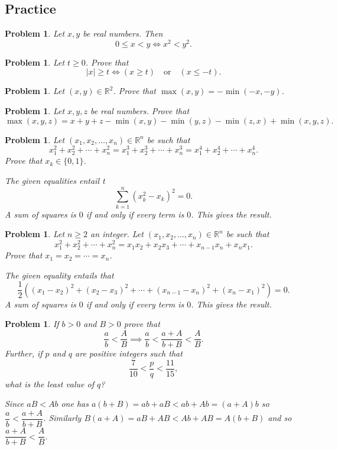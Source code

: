 \documentclass[11pt, openany]{book}
\theoremstyle{change} \theoremheaderfont{\blue\sffamily\bfseries}
\newtheorem{pro}[thm]{Problem}
\theoremstyle{nonumberplain} \theoremheaderfont{\sffamily\bfseries}
\newcommand{\BBR}{\mathbb{R}}
\newcommand{\í}{\'{\i}}
\begin{document}
\subsection*{Practice}
\begin{multicols}{2}\columnseprule 1pt \columnsep
25pt
\begin{pro}
Let $x, y$ be real numbers. Then $$ 0 \leq  x < y \iff x^2 < y^2. $$
\end{pro}
\begin{pro}Let $t \geq 0$. Prove that
$$|x| \geq t \iff (x \geq t) \quad \mathrm{or}\quad (x\leq -t).  $$
\end{pro}
\begin{pro}
Let $(x, y)\in \BBR^2$. Prove that $\max (x, y)=-\min (-x, -y)$.
\end{pro}

\begin{pro}
Let $x, y , z$ be real numbers. Prove that
$$
\max (x, y, z)   =   x + y + z - \min (x, y) - \min (y, z)  - \min
(z, x) + \min (x, y , z). $$
\end{pro}

\begin{pro}Let $(x_1,x_2, \ldots, x_n)\in\BBR^n$ be such that $$ x_1 ^2+x_2 ^2+\cdots +x_n ^2=
x_1 ^3+x_2 ^3+\cdots +x_n ^3=x_1 ^4+x_2 ^4+\cdots +x_n ^4.
$$Prove that $x_k\in \{0,1\}$.
\begin{answer}
The given equalities entail t $$ \sum _{k=1} ^n (x_k ^2-x_k)^2=0.
$$A sum of squares is $0$ if and only if every term is $0$. This
gives the result.
\end{answer}
\end{pro}
\begin{pro}Let $n \geq 2$ an integer. Let $(x_1,x_2, \ldots, x_n)\in\BBR^n$ be such that $$ x_1 ^2+x_2 ^2+\cdots +x_n ^2=x_1x_2+x_2x_3+\cdots + x_{n-1}x_n+x_nx_1  .
$$Prove that $x_1=x_2=\cdots=x_n$.
\begin{answer}
The given equality entails that $$
\dfrac{1}{2}\left((x_1-x_2)^2+(x_2-x_3)^2+\cdots +
(x_{n-1}-x_n)^2+(x_n-x_1)^2\right)=0.
$$A sum of squares is $0$ if and only if every term is $0$. This
gives the result.
\end{answer}
\end{pro}

\begin{pro}
If $b>0$ and $B>0$ prove that
$$ \dfrac{a}{b}<\dfrac{A}{B}\implies \dfrac{a}{b}<\dfrac{a+A}{b+B}<\dfrac{A}{B}.
$$Further, if
$p$ and $q$ are positive integers such that
$$ \dfrac{7}{10} < \dfrac{p}{q} < \dfrac{11}{15},
$$what is the least value of $q$? \\
\begin{answer}
Since $aB<Ab$ one has $a(b+B)=ab +aB <ab+Ab = (a+A)b$ so
$\dfrac{a}{b}<\dfrac{a+A}{b+B}$. Similarly $B(a+A) = aB+AB<Ab+AB =
A(b+B)$ and so $\dfrac{a+A}{b+B}<\dfrac{A}{B}$.


\end{answer}
\end{pro}
\end{multicols}
\end{document}
